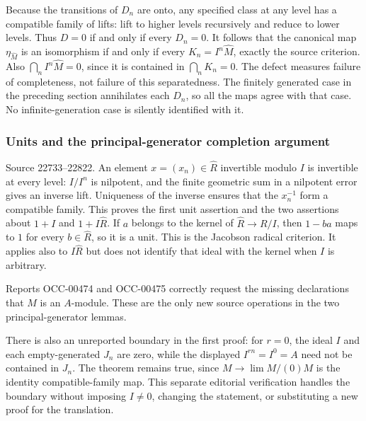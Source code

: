 Because the transitions of \(D_n\) are onto, any specified class at any level has a compatible family of lifts: lift to higher levels recursively and reduce to lower levels. Thus \(D=0\) if and only if every \(D_n=0\). It follows that the canonical map \(\eta_{\widehat M}\) is an isomorphism if and only if every \(K_n=I^n\widehat M\), exactly the source criterion. Also \(\bigcap_n I^n\widehat M=0\), since it is contained in \(\bigcap_nK_n=0\). The defect measures failure of completeness, not failure of this separatedness. The finitely generated case in the preceding section annihilates each \(D_n\), so all the maps agree with that case. No infinite-generation case is silently identified with it.

\subsubsection{Units and the principal-generator completion argument}\label{units-and-the-principal-generator-completion-argument}

Source 22733--22822. An element \(x=(x_n)\in\widehat R\) invertible modulo \(I\) is invertible at every level: \(I/I^n\) is nilpotent, and the finite geometric sum in a nilpotent error gives an inverse lift. Uniqueness of the inverse ensures that the \(x_n^{-1}\) form a compatible family. This proves the first unit assertion and the two assertions about \(1+I\) and \(1+I\widehat R\). If \(a\) belongs to the kernel of \(\widehat R\to R/I\), then \(1-ba\) maps to \(1\) for every \(b\in\widehat R\), so it is a unit. This is the Jacobson radical criterion. It applies also to \(I\widehat R\) but does not identify that ideal with the kernel when \(I\) is arbitrary.

Reports OCC-00474 and OCC-00475 correctly request the missing declarations that \(M\) is an \(A\)-module. These are the only new source operations in the two principal-generator lemmas.

There is also an unreported boundary in the first proof: for \(r=0\), the ideal \(I\) and each empty-generated \(J_n\) are zero, while the displayed \(I^{rn}=I^0=A\) need not be contained in \(J_n\). The theorem remains true, since \(M\to\lim M/(0)M\) is the identity compatible-family map. This separate editorial verification handles the boundary without imposing \(I\ne0\), changing the statement, or substituting a new proof for the translation.


